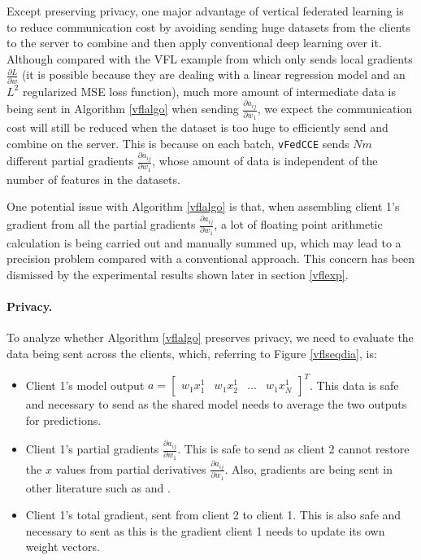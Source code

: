 \documentclass{article}
\begin{document}
Except preserving privacy, one major advantage of vertical federated learning is to reduce communication cost by avoiding sending huge datasets from the clients to the server to combine and then apply conventional deep learning over it. Although compared with the VFL example from \cite{yang2019federated} which only sends local gradients $\frac{\partial L}{\partial w}$ (it is possible because they are dealing with a linear regression model and an $L^2$ regularized MSE loss function), much more amount of intermediate data is being sent in Algorithm \ref{vflalgo} when sending $\frac{\partial a_{ij}}{\partial w_1}$, we expect the communication cost will still be reduced when the dataset is too huge to efficiently send and combine on the server. This is because on each batch, \texttt{vFedCCE} sends $Nm$ different partial gradients $\frac{\partial a_{ij}}{\partial w_1}$, whose amount of data is independent of the number of features in the datasets.

One potential issue with Algorithm \ref{vflalgo} is that, when assembling client 1's gradient from all the partial gradients $\frac{\partial a_{ij}}{\partial w_1}$, a lot of floating point arithmetic calculation is being carried out and manually summed up, which may lead to a precision problem compared with a conventional approach. This concern has been dismissed by the experimental results shown later in section \ref{vflexp}.

\paragraph{Privacy.} To analyze whether Algorithm \ref{vflalgo} preserves privacy, we need to evaluate the data being sent across the clients, which, referring to Figure \ref{vflseqdia}, is:
\begin{itemize}
  \item Client 1's model output $a=\begin{bmatrix} w_1x_1^1& w_1x_2^1& \ldots &w_1x_N^1 \end{bmatrix}^T$. This data is safe and necessary to send as the shared model needs to average the two outputs for predictions.
  \item Client 1's partial gradients $\frac{\partial a_{ij}}{\partial w_1}$. This is safe to send as client 2 cannot restore the $x$ values from partial derivatives $\frac{\partial a_{ij}}{\partial w_1}$. Also, gradients are being sent in other literature such as \cite{yang2019federated} and \cite{hardy2017private}.
  \item Client 1's total gradient, sent from client 2 to client 1. This is also safe and necessary to sent as this is the gradient client 1 needs to update its own weight vectors.
\end{itemize}
\end{document}
